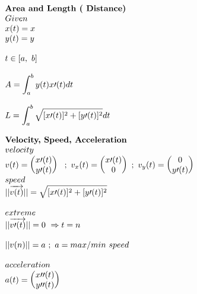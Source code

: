 \documentclass{article}
\begin{document}
\setlength{\columnsep}{0.1cm} 
\begin{multicols}{2}
    \noindent 
    \[
    \begin{array}{>{\displaystyle}l}
        \textbf{Area\ and\ Length\ ( Distance) \ }\\
        Given\ \\
        x( t) =x\\
        y( t) =y\\
        \\
        t\in [ a,\ b]\\
        \\
        A=\int ^{b}_{a} y( t) x\prime ( t) dt\\
        \\
        L=\int ^{b}_{a}\sqrt{[ x\prime ( t)]^{2} +[ y\prime ( t)]^{2}} dt\\
        \\
        \textbf{Velocity,\ Speed, Acceleration\ }\\
        velocity\ \\
        v( t) =\begin{pmatrix}
        x\prime ( t)\\
        y\prime ( t)
        \end{pmatrix} \ \ ;\ v_{x}( t) =\begin{pmatrix}
        x\prime ( t)\\
        0
        \end{pmatrix} \ ;\ v_{y}( t) =\begin{pmatrix}
        0\\
        y\prime ( t)
        \end{pmatrix}
        \\
        speed\ \\
        ||\overrightarrow{v( t)} ||=\sqrt{[ x\prime ( t)]^{2} +[ y\prime ( t)]^{2}}\\
        \\
        extreme\ \\
        ||\overrightarrow{v\prime ( t)} ||=0\ \Rightarrow t=n\\
        \\
        ||v( n) ||=a\ ;\ a=max/min\ speed\\
        \\
        acceleration\\
        a( t) =\begin{pmatrix}
        x\prime \prime ( t)\\
        y\prime \prime ( t)
        \end{pmatrix}\\

\end{array}\]
\end{multicols}
\end{document}
